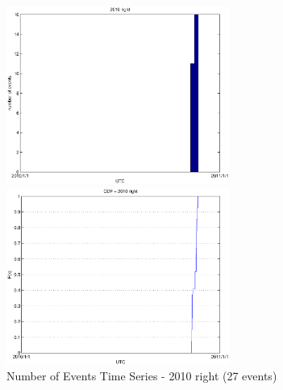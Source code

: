 \documentclass[a4paper,11pt]{article}
\begin{document}
\begin{figure}[htbp]
\begin{minipage}{0.55\hsize}
\centering
\includegraphics[width=7.3cm, clip]{histTime2010R.eps}
\end{minipage}
\begin{minipage}{0.55\hsize}
 \centering
\includegraphics[width=7.3cm, clip]{CDFTime2010R.eps}
\end{minipage}
\caption{Number of Events Time Series - 2010 right (27 events)}
\end{figure}

\newpage
\end{document}
